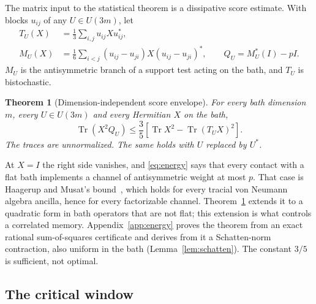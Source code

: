 \documentclass[11pt]{article}
\newtheorem{theorem}{Theorem}
\theoremstyle{definition}
\theoremstyle{remark}
\DeclareMathOperator{\Tr}{Tr}
\begin{document}
The matrix input to the statistical theorem is a dissipative score estimate. With blocks $u_{ij}$ of any $U\in U(3m)$, let
\begin{align*}
 T_U(X)&=\frac13\sum_{i,j}u_{ij}Xu_{ij}^*,\\
 M_U(X)&=\frac16\sum_{i<j}(u_{ij}-u_{ji})X(u_{ij}-u_{ji})^*,\qquad
 Q_U=M_U^*(I)-pI.
\end{align*}
$M_U$ is the antisymmetric branch of a support test acting on the bath, and $T_U$ is bistochastic.

\begin{theorem}[Dimension-independent score envelope]\label{thm:envelope}
For every bath dimension $m$, every $U\in U(3m)$ and every Hermitian $X$ on the bath,
\begin{equation}\label{eq:energy}
 \Tr(X^2Q_U)\le\frac35\left[\Tr X^2-\Tr(T_U X)^2\right].
\end{equation}
The traces are unnormalized. The same holds with $U$ replaced by $U^*$.
\end{theorem}

At $X=I$ the right side vanishes, and \eqref{eq:energy} says that every contact with a flat bath implements a channel of antisymmetric weight at most $p$. That case is Haagerup and Musat's bound~\cite[Lemmas~5.4 and~5.5]{HM2015}, which holds for every tracial von Neumann algebra ancilla, hence for every factorizable channel. Theorem~\ref{thm:envelope} extends it to a quadratic form in bath operators that are not flat; this extension is what controls a correlated memory. Appendix~\ref{app:energy} proves the theorem from an exact rational sum-of-squares certificate and derives from it a Schatten-norm contraction, also uniform in the bath (Lemma~\ref{lem:schatten}). The constant $3/5$ is sufficient, not optimal.

\subsection{The critical window}
\end{document}
